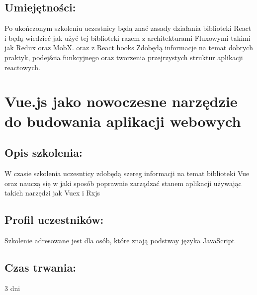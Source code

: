 \documentclass{article}[10pt]
\begin{document}
	\subsection*{Umiejętności:}
\begin{adjustwidth}{2cm}{}
\justifying
	
Po ukończonym szkoleniu uczestnicy będą znać zasady działania biblioteki React i będą wiedzieć jak użyć tej biblioteki razem z architekturami Fluxowymi takimi jak Redux oraz MobX. oraz z React hooks Zdobędą informacje na temat dobrych praktyk, podejścia funkcyjnego oraz tworzenia przejrzystych struktur aplikacji reactowych.

\end{adjustwidth}

\newpage


    
	\section{Vue.js jako nowoczesne narzędzie do budowania aplikacji webowych}

	\subsection*{Opis szkolenia:}
	\begin{adjustwidth}{2cm}{}
\justifying
		W czasie szkolenia uczesnticy zdobędą szereg informacji na temat biblioteki Vue oraz nauczą się w jaki sposób poprawnie zarządzać stanem aplikacji używając takich narzędzi jak Vuex i Rxjs
	\end{adjustwidth}
	\subsection*{Profil uczestników:}
\begin{adjustwidth}{2cm}{}
\justifying
	Szkolenie adresowane jest dla osób, które znają podstway języka JavaScript
\end{adjustwidth}
	\subsection*{Czas trwania:}
\begin{adjustwidth}{2cm}{}
	3 dni
\end{adjustwidth}
\end{document}
